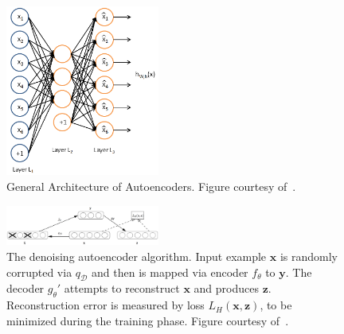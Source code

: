 \begin{figure}[h]
\centering
\includegraphics[width=0.45\textwidth]{figures/autoencoder.png}
\caption{General Architecture of Autoencoders.
        Figure courtesy of~\cite{UFLDLAutoencoder}.}
\label{Fig:AEArchitecture}
\end{figure}

\begin{figure}[h]
\centering
\includegraphics[width=0.45\textwidth]{figures/denoiseautoencoder.png}
        \caption{The denoising autoencoder algorithm.
        Input example $\mathbf{x}$ is randomly corrupted via $q_\mathcal{D}$ and then
        is mapped via encoder $f_\theta$ to $\mathbf{y}$.
        The decoder $g_\theta'$ attempts to reconstruct $\mathbf{x}$ and produces $\mathbf{z}$.
        Reconstruction error is measured by loss $L_H(\mathbf{x}, \mathbf{z})$, to be minimized
        during the training phase.
        Figure courtesy of~\cite{DenoiseAE}.}
\label{Fig:dAEAlgorithm}
\end{figure}

